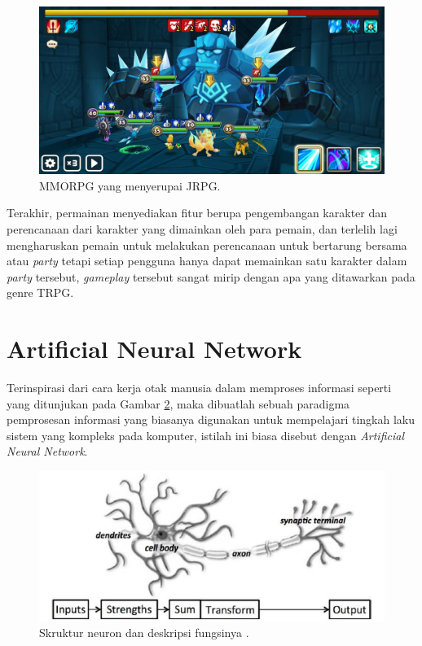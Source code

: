 \begin{figure} [!h] \centering
	\includegraphics[scale=0.26]{img/sw.jpg}
	\caption{MMORPG yang menyerupai JRPG.}
	\label{fig:sw}
\end{figure}

Terakhir, permainan menyediakan fitur berupa pengembangan karakter dan perencanaan dari karakter yang dimainkan oleh para pemain, dan terlelih lagi mengharuskan pemain untuk melakukan perencanaan untuk bertarung bersama atau \textit{party} tetapi setiap pengguna hanya dapat memainkan satu karakter dalam \textit{party} tersebut, \textit{gameplay} tersebut sangat mirip dengan apa yang ditawarkan pada genre TRPG.
\vspace{1ex}

\section{Artificial Neural Network}
\label{sec:sec2_ann}
\vspace{1ex}

Terinspirasi dari cara kerja otak manusia dalam memproses informasi seperti yang ditunjukan pada Gambar \ref{fig:ann_neuron}, maka dibuatlah sebuah paradigma pemprosesan informasi yang biasanya digunakan untuk mempelajari tingkah laku sistem yang kompleks pada komputer, istilah ini biasa disebut dengan \textit{Artificial Neural Network}.
\vspace{1ex}

\begin{figure} [!h] \centering
	\includegraphics[scale=0.65]{img/ann_neuron.png}
	\caption{Skruktur neuron dan deskripsi fungsinya \citep{buduma2017}.}
	\label{fig:ann_neuron}
\end{figure}


